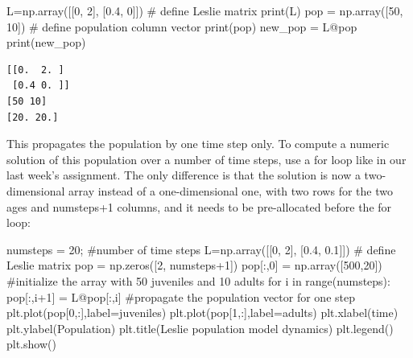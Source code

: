 \documentclass[
  letterpaper,
  DIV=11,
  numbers=noendperiod]{scrreprt}
\newenvironment{Shaded}{\begin{snugshade}}{\end{snugshade}}
\newcommand{\BuiltInTok}[1]{\textcolor[rgb]{0.00,0.23,0.31}{#1}}
\newcommand{\CommentTok}[1]{\textcolor[rgb]{0.37,0.37,0.37}{#1}}
\newcommand{\ControlFlowTok}[1]{\textcolor[rgb]{0.00,0.23,0.31}{#1}}
\newcommand{\DecValTok}[1]{\textcolor[rgb]{0.68,0.00,0.00}{#1}}
\newcommand{\FloatTok}[1]{\textcolor[rgb]{0.68,0.00,0.00}{#1}}
\newcommand{\KeywordTok}[1]{\textcolor[rgb]{0.00,0.23,0.31}{#1}}
\newcommand{\NormalTok}[1]{\textcolor[rgb]{0.00,0.23,0.31}{#1}}
\newcommand{\OperatorTok}[1]{\textcolor[rgb]{0.37,0.37,0.37}{#1}}
\newcommand{\StringTok}[1]{\textcolor[rgb]{0.13,0.47,0.30}{#1}}
\begin{document}
\begin{Shaded}
\begin{Highlighting}[]
\NormalTok{L}\OperatorTok{=}\NormalTok{np.array([[}\DecValTok{0}\NormalTok{, }\DecValTok{2}\NormalTok{], [}\FloatTok{0.4}\NormalTok{, }\DecValTok{0}\NormalTok{]]) }\CommentTok{\# define Leslie matrix}
\BuiltInTok{print}\NormalTok{(L)}
\NormalTok{pop }\OperatorTok{=}\NormalTok{ np.array([}\DecValTok{50}\NormalTok{, }\DecValTok{10}\NormalTok{]) }\CommentTok{\# define population column vector}
\BuiltInTok{print}\NormalTok{(pop)}
\NormalTok{new\_pop }\OperatorTok{=}\NormalTok{ L}\OperatorTok{@}\NormalTok{pop}
\BuiltInTok{print}\NormalTok{(new\_pop)}
\end{Highlighting}
\end{Shaded}

\begin{verbatim}
[[0.  2. ]
 [0.4 0. ]]
[50 10]
[20. 20.]
\end{verbatim}

This propagates the population by one time step only. To compute a
numeric solution of this population over a number of time steps, use a
for loop like in our last week's assignment. The only difference is that
the solution is now a two-dimensional array instead of a one-dimensional
one, with two rows for the two ages and numsteps+1 columns, and it needs
to be pre-allocated before the for loop:

\begin{Shaded}
\begin{Highlighting}[]
\NormalTok{numsteps }\OperatorTok{=} \DecValTok{20}\OperatorTok{;} \CommentTok{\#number of time steps}
\NormalTok{L}\OperatorTok{=}\NormalTok{np.array([[}\DecValTok{0}\NormalTok{, }\DecValTok{2}\NormalTok{], [}\FloatTok{0.4}\NormalTok{, }\FloatTok{0.1}\NormalTok{]]) }\CommentTok{\# define Leslie matrix}
\NormalTok{pop }\OperatorTok{=}\NormalTok{ np.zeros([}\DecValTok{2}\NormalTok{, numsteps}\OperatorTok{+}\DecValTok{1}\NormalTok{])}
\NormalTok{pop[:,}\DecValTok{0}\NormalTok{] }\OperatorTok{=}\NormalTok{ np.array([}\DecValTok{500}\NormalTok{,}\DecValTok{20}\NormalTok{]) }\CommentTok{\#initialize the array with 50 juveniles and 10 adults}
\ControlFlowTok{for}\NormalTok{ i }\KeywordTok{in} \BuiltInTok{range}\NormalTok{(numsteps):}
\NormalTok{    pop[:,i}\OperatorTok{+}\DecValTok{1}\NormalTok{] }\OperatorTok{=}\NormalTok{ L}\OperatorTok{@}\NormalTok{pop[:,i] }\CommentTok{\#propagate the population vector for one step}
\NormalTok{plt.plot(pop[}\DecValTok{0}\NormalTok{,:],label}\OperatorTok{=}\StringTok{\textquotesingle{}juveniles\textquotesingle{}}\NormalTok{)}
\NormalTok{plt.plot(pop[}\DecValTok{1}\NormalTok{,:],label}\OperatorTok{=}\StringTok{\textquotesingle{}adults\textquotesingle{}}\NormalTok{) }
\NormalTok{plt.xlabel(}\StringTok{\textquotesingle{}time\textquotesingle{}}\NormalTok{)}
\NormalTok{plt.ylabel(}\StringTok{\textquotesingle{}Population\textquotesingle{}}\NormalTok{)}
\NormalTok{plt.title(}\StringTok{\textquotesingle{}Leslie population model dynamics\textquotesingle{}}\NormalTok{)}
\NormalTok{plt.legend()}
\NormalTok{plt.show()}
\end{Highlighting}
\end{Shaded}
\end{document}
